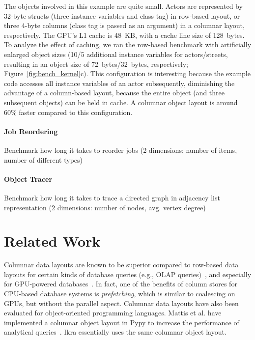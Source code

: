 \documentclass[preprint]{sigplanconf}
\begin{document}
The objects involved in this example are quite small. Actors are represented by 32-byte structs (three instance variables and class tag) in row-based layout, or three 4-byte columns (class tag is passed as an argument) in a columnar layout, respectively. The GPU's L1 cache is 48~KB, with a cache line size of 128~bytes. To analyze the effect of caching, we ran the row-based benchmark with artificially enlarged object sizes (10/5 additional instance variables for actors/streets, resulting in an object size of 72~bytes/32~bytes, respectively; Figure~\ref{fig:bench_kernel}c). This configuration is interesting because the example code accesses all instance variables of an actor subsequently, diminishing the advantage of a column-based layout, because the entire object (and three subsequent objects) can be held in cache. A columnar object layout is around 60\% faster compared to this configuration.

\paragraph{Job Reordering}
Benchmark how long it takes to reorder jobs (2 dimensions: number of items, number of different types)

\paragraph{Object Tracer}
Benchmark how long it takes to trace a directed graph in adjacency list representation (2 dimensions: number of nodes, avg. vertex degree)


\section{Related Work}
Columnar data layouts are known to be superior compared to row-based data layouts for certain kinds of database queries (e.g., OLAP queries)~\cite{Plattner:2009:CDA:1559845.1559846}, and especially for GPU-powered databases~\cite{Bakkum:2010:ASD:1735688.1735706}. In fact, one of the benefits of column stores for CPU-based database systems is \emph{prefetching}, which is similar to coalescing on GPUs, but without the parallel aspect. Columnar data layouts have also been evaluated for object-oriented programming languages. Mattis et al. have implemented a columnar object layout in Pypy to increase the performance of analytical queries~\cite{Mattis:2015:COI:2814228.2814230}. Ikra essentially uses the same columnar object layout.
\end{document}
